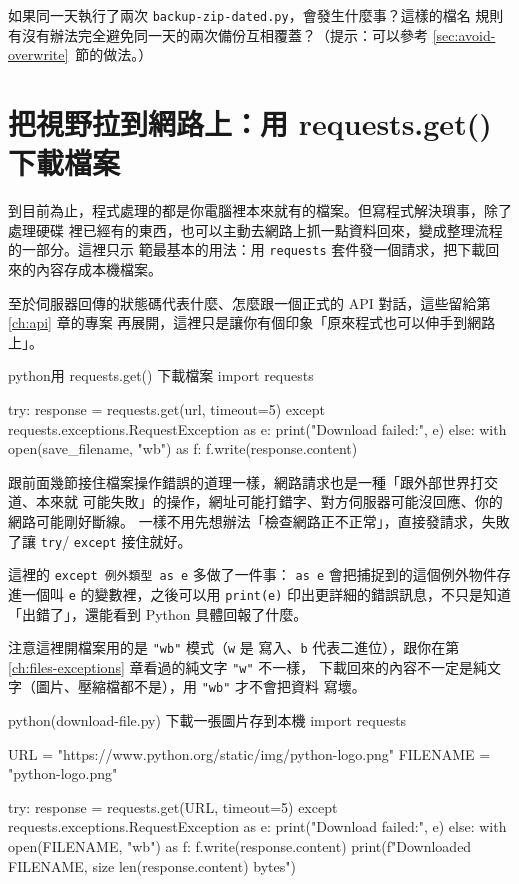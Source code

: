 \begin{drills}[label=drills:backup-timestamp]
\item 如果同一天執行了兩次 \texttt{backup-zip-dated.py}，會發生什麼事？這樣的檔名
規則有沒有辦法完全避免同一天的兩次備份互相覆蓋？（提示：可以參考
\ref{sec:avoid-overwrite}~節的做法。）
\end{drills}

\section{把視野拉到網路上：用 requests.get() 下載檔案}
\label{sec:requests-download}

到目前為止，程式處理的都是你電腦裡本來就有的檔案。但寫程式解決瑣事，除了處理硬碟
裡已經有的東西，也可以主動去網路上抓一點資料回來，變成整理流程的一部分。這裡只示
範最基本的用法：用 \texttt{requests} 套件發一個請求，把下載回來的內容存成本機檔案。

至於伺服器回傳的狀態碼代表什麼、怎麼跟一個正式的 API 對話，這些留給第 \ref{ch:api} 章的專案
再展開，這裡只是讓你有個印象「原來程式也可以伸手到網路上」。

\begin{code}{python}{用 requests.get() 下載檔案}
import requests

try:
    response = requests.get(url, timeout=5)
except requests.exceptions.RequestException as e:
    print("Download failed:", e)
else:
    with open(save_filename, "wb") as f:
        f.write(response.content)
\end{code}

跟前面幾節接住檔案操作錯誤的道理一樣，網路請求也是一種「跟外部世界打交道、本來就
可能失敗」的操作，網址可能打錯字、對方伺服器可能沒回應、你的網路可能剛好斷線。
一樣不用先想辦法「檢查網路正不正常」，直接發請求，失敗了讓 \texttt{try}/
\texttt{except} 接住就好。

這裡的 \texttt{except 例外類型 as e} 多做了一件事：
\texttt{as e} 會把捕捉到的這個例外物件存進一個叫 \texttt{e} 的變數裡，之後可以用
\texttt{print(e)} 印出更詳細的錯誤訊息，不只是知道「出錯了」，還能看到 Python
具體回報了什麼。

注意這裡開檔案用的是 \texttt{"wb"} 模式（\texttt{w} 是
寫入、\texttt{b} 代表二進位），跟你在第 \ref{ch:files-exceptions} 章看過的純文字 \texttt{"w"} 不一樣，
下載回來的內容不一定是純文字（圖片、壓縮檔都不是），用 \texttt{"wb"} 才不會把資料
寫壞。

\begin{example}{python}{(download-file.py) 下載一張圖片存到本機}
import requests

URL = "https://www.python.org/static/img/python-logo.png"
FILENAME = "python-logo.png"

try:
    response = requests.get(URL, timeout=5)
except requests.exceptions.RequestException as e:
    print("Download failed:", e)
else:
    with open(FILENAME, "wb") as f:
        f.write(response.content)
    print(f"Downloaded {FILENAME}, size {len(response.content)} bytes")
\end{example}

